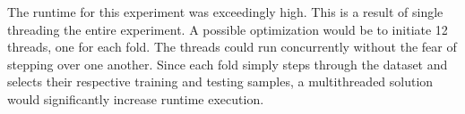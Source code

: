 The runtime for this experiment was exceedingly high. This is a result of single threading 
the entire experiment. A possible optimization would be to initiate 12 threads, one for 
each fold. The threads could run concurrently without the fear of stepping over one another. 
Since each fold simply steps through the dataset and selects their respective training and 
testing samples, a multithreaded solution would significantly increase runtime execution. 